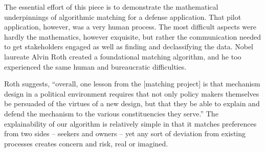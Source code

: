 The essential effort of this piece is to demonstrate the mathematical underpinnings of algorithmic matching for a defense application. That pilot application, however, was a very human process. The most difficult aspects were hardly the mathematics, however exquisite, but rather the communication needed to get stakeholders engaged as well as finding and declassifying the data. Nobel laureate Alvin Roth created a foundational matching algorithm, and he too experienced the same human and bureaucratic difficulties.

Roth suggests, ``overall, one lesson from the [matching project] is that mechanism design in a political environment requires that not only policy makers themselves be persuaded of the virtues of a new design, but that they be able to explain and defend the mechanism to the various constituencies they serve.'' \cite{2006_Atila} The explainability of our algorithm is relatively simple in that it matches preferences from two sides -- seekers and owners -- yet any sort of deviation from existing processes creates concern and risk, real or imagined.